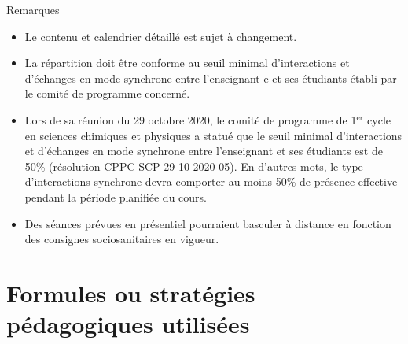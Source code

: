 \documentclass[12pt,undergraduate]{uqtrplandecours}
\begin{document}
\nextclass
{}

\nextclass
{}

\nextclass
{}

\nextclass
{}

\nextclass
{}

\nextclass
{}

\nextclass
{}

\FloatBarrier
\printcalendarremote

\bigskip
\noindent
Remarques
\begin{itemize}
  \item Le contenu et calendrier détaillé est sujet à changement.
  \item La répartition doit être conforme au seuil minimal d’interactions et d’échanges en mode synchrone
        entre l’enseignant-e et ses étudiants établi par le comité de programme concerné.
  \item Lors de sa réunion du 29 octobre 2020, le comité de programme de 1$^{\text{er}}$ cycle en sciences chimiques et physiques
        a statué que le seuil minimal d’interactions et d’échanges en mode synchrone
        entre l’enseignant et ses étudiants est de 50\% (résolution CPPC SCP 29-10-2020-05).
        En d’autres mots, le type d’interactions synchrone devra comporter au moins 50\%
        de présence effective pendant la période planifiée du cours.
  \item Des séances prévues en présentiel pourraient basculer à distance en fonction des consignes sociosanitaires en vigueur.
\end{itemize}

\FloatBarrier


\clearpage
\section{Formules ou stratégies pédagogiques utilisées}
\end{document}
